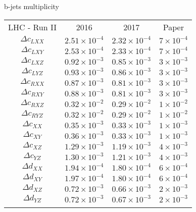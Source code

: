 \documentclass[a4paper,11pt,twoside,french]{article}
\begin{document}
b-jets multiplicity
\begin{table}[h!]\footnotesize 
    \begin{tabular}{ccc||c}
        \hline\noalign{\smallskip}
         LHC - Run II  &  2016  & 2017 & Paper \\
        \noalign{\smallskip}\hline\noalign{\smallskip}
        $\Delta c_{LXX}$ & $2.51\times 10^{-4}$  & $2.32\times 10^{-4}$&
        $7\times 10^{-4}$ \\
        $\Delta c_{LXY}$ & $2.53\times 10^{-4}$  & $2.33\times 10^{-4}$&
        $7\times 10^{-4}$ \\
        $\Delta c_{LXZ}$ & $0.92\times 10^{-3}$ & $0.85\times 10^{-3}$ &
        $3\times 10^{-3}$\\
        $\Delta c_{LYZ}$ & $0.93\times 10^{-3}$ & $0.86\times 10^{-3}$ &
        $3\times 10^{-3}$\\
        \noalign{\smallskip}\hline\noalign{\smallskip}
        $\Delta c_{RXX}$ & $0.87\times 10^{-3}$  & $0.81\times 10^{-3}$&
         $3\times 10^{-3}$\\
        $\Delta c_{RXY}$ & $0.88\times 10^{-3}$  & $0.81\times 10^{-3}$&
         $3\times 10^{-3}$\\
        $\Delta c_{RXZ}$ & $0.32\times 10^{-2}$ & $0.29\times 10^{-2}$ &
        $1\times 10^{-2}$ \\
        $\Delta c_{RYZ}$ & $0.32\times 10^{-2}$ & $0.29\times 10^{-2}$ &
        $1\times 10^{-2}$ \\
        \noalign{\smallskip}\hline\noalign{\smallskip}
        $\Delta c_{XX}$ & $0.35\times 10^{-3}$  & $0.33\times 10^{-3}$ &
         $1\times 10^{-3}$\\
        $\Delta c_{XY}$ & $0.36\times 10^{-3}$  & $0.33\times 10^{-3}$ &
         $1\times 10^{-3}$\\
        $\Delta c_{XZ}$ & $1.29\times 10^{-3}$ & $1.19\times 10^{-3}$  &
        $4\times 10^{-3}$ \\
        $\Delta c_{YZ}$ & $1.30\times 10^{-3}$ & $1.21\times 10^{-3}$  &
        $4\times 10^{-3}$ \\
        \noalign{\smallskip}\hline\noalign{\smallskip}
        $\Delta d_{XX}$ & $1.94\times 10^{-4}$  & $1.80\times 10^{-4}$ &
        $6\times 10^{-4}$ \\
        $\Delta d_{XY}$ & $1.97\times 10^{-4}$  & $1.80\times 10^{-4}$ &
        $6\times 10^{-4}$ \\
        $\Delta d_{XZ}$ & $0.72\times 10^{-3}$ & $0.66\times 10^{-3}$ &
         $2\times 10^{-3}$\\
        $\Delta d_{YZ}$ & $0.72\times 10^{-3}$ & $0.67\times 10^{-3}$ &
         $2\times 10^{-3}$\\
        \noalign{\smallskip}\hline\vspace{0.1cm}
    \end{tabular}
\end{table}
\end{document}
